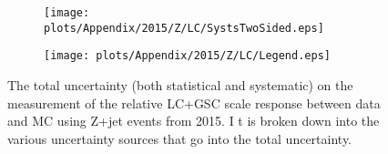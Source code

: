 \begin{figure}[!ht]
\captionsetup[subfigure]{labelformat=empty}
 \begin{center}
   \begin{subfigure}{0.5\textwidth}
     \hspace{-3cm}
     \texttt{[image: plots/Appendix/2015/Z/LC/SystsTwoSided.eps]}
   \end{subfigure}
   \begin{subfigure}{0.5\textwidth}
     \hspace{-3cm}
     \texttt{[image: plots/Appendix/2015/Z/LC/Legend.eps]}
   \end{subfigure}
 \end{center}
 \caption[Uncertainty on the LC+GSC scale response measurement using Z+jet]
 {\small The total uncertainty (both statistical and systematic) on the measurement of the relative LC+GSC scale response between data and MC using Z+jet events from 2015.  I
t is broken down into the various uncertainty sources that go into the total uncertainty.  }
 \label{Fig:ZJetSystsLC2015}
\end{figure}



